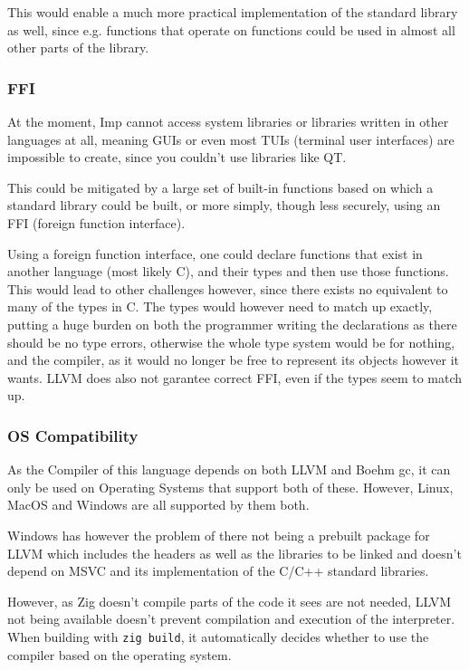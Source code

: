 \documentclass[12pt]{article}
\begin{document}
This would enable a much more practical implementation of the standard
library as well, since e.g. functions that operate on functions could be used
in almost all other parts of the library.

\subsubsection{FFI}
At the moment, Imp cannot access system libraries or libraries
written in other languages at all, meaning GUIs or even most TUIs
(terminal user interfaces) are impossible to create,
since you couldn't use libraries like QT.

This could be mitigated by a large set of built-in functions based
on which a standard library could be built, or more simply, though
less securely, using an FFI (foreign function interface).

Using a foreign function interface, one could declare functions that
exist in another language (most likely C), and their types and then use
those functions. This would lead to other challenges however, since
there exists no equivalent to many of the types in C.
The types would however need to match up exactly,
putting a huge burden on both the programmer writing the declarations
as there should be no type errors, otherwise the whole type system
would be for nothing, and the compiler, as it would no longer
be free to represent its objects however it wants.
LLVM does also not garantee correct FFI, even if the types
seem to match up.

\subsubsection{OS Compatibility}
As the Compiler of this language depends on both
LLVM and Boehm \Gls{gc}, it can only be used on Operating Systems
that support both of these. However, Linux, MacOS and Windows
are all supported by them both.

Windows has however the problem of there not being
a prebuilt package for LLVM which includes the headers as well
as the libraries to be linked and doesn't depend on MSVC and its
implementation of the C/C++ standard libraries.

However, as Zig doesn't compile parts of the code it sees are not needed,
LLVM not being available doesn't prevent compilation and execution of the interpreter.
When building with \texttt{zig build}, it automatically decides whether to use
the compiler based on the operating system.
\end{document}
